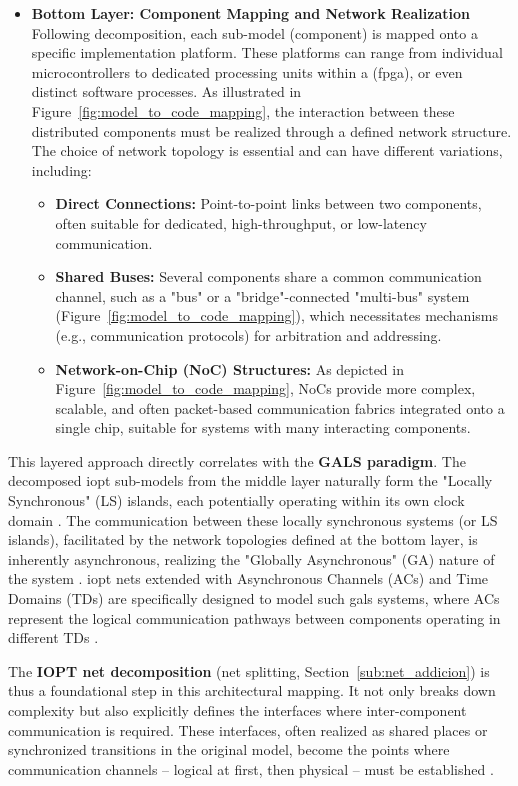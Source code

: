\begin{itemize}
    \item \textbf{Bottom Layer: Component Mapping and Network Realization} \\
    Following decomposition, each sub-model (component) is mapped onto a specific implementation platform. These platforms can range from individual microcontrollers to dedicated processing units within a (\gls{fpga}), or even distinct software processes. As illustrated in Figure~\ref{fig:model_to_code_mapping}, the interaction between these distributed components must be realized through a defined network structure. The choice of network topology is essential and can have different variations, including:
    \begin{itemize}
        \item \textbf{Direct Connections:} Point-to-point links between two components, often suitable for dedicated, high-throughput, or low-latency communication.
        \item \textbf{Shared Buses:} Several components share a common communication channel, such as a "bus" or a "bridge"-connected "multi-bus" system (Figure~\ref{fig:model_to_code_mapping}), which necessitates mechanisms (e.g., communication protocols) for arbitration and addressing.
        \item \textbf{Network-on-Chip (NoC) Structures:} As depicted in Figure~\ref{fig:model_to_code_mapping}, NoCs provide more complex, scalable, and often packet-based communication fabrics integrated onto a single chip, suitable for systems with many interacting components.
    \end{itemize}
\end{itemize}

This layered approach directly correlates with the \textbf{GALS paradigm}. The decomposed \gls{iopt} sub-models from the middle layer naturally form the "Locally Synchronous" (LS) islands, each potentially operating within its own clock domain \cite{galsactd}. The communication between these locally  synchronous systems (or LS islands), facilitated by the network topologies defined at the bottom layer, is inherently asynchronous, realizing the "Globally Asynchronous" (GA) nature of the system \cite{galsborman}. \gls{iopt} nets extended with Asynchronous Channels (ACs) and Time Domains (TDs) are specifically designed to model such \gls{gals} systems, where ACs represent the logical communication pathways between components operating in different TDs \cite{galsactd, iopttools}.

The \textbf{IOPT net decomposition} (net splitting, Section~\ref{sub:net_addicion}) is thus a foundational step in this architectural mapping. It not only breaks down complexity but also explicitly defines the interfaces where inter-component communication is required. These interfaces, often realized as shared places or synchronized transitions in the original model, become the points where communication channels – logical at first, then physical – must be established \cite{Barrosadd}.

